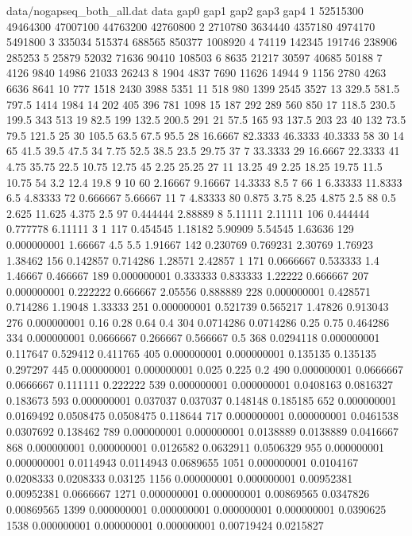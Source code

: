 \begin{filecontents}{data/nogapseq_both_all.dat}
data	gap0	gap1	gap2	gap3	gap4
1	52515300	49464300	47007100	44763200	42760800
2	2710780	3634440	4357180	4974170	5491800
3	335034	515374	688565	850377	1008920
4	74119	142345	191746	238906	285253
5	25879	52032	71636	90410	108503
6	8635	21217	30597	40685	50188
7	4126	9840	14986	21033	26243
8	1904	4837	7690	11626	14944
9	1156	2780	4263	6636	8641
10	777	1518	2430	3988	5351
11	518	980	1399	2545	3527
13	329.5	581.5	797.5	1414	1984
14	202	405	396	781	1098
15	187	292	289	560	850
17	118.5	230.5	199.5	343	513
19	82.5	199	132.5	200.5	291
21	57.5	165	93	137.5	203
23	40	132	73.5	79.5	121.5
25	30	105.5	63.5	67.5	95.5
28	16.6667	82.3333	46.3333	40.3333	58
30	14	65	41.5	39.5	47.5
34	7.75	52.5	38.5	23.5	29.75
37	7	33.3333	29	16.6667	22.3333
41	4.75	35.75	22.5	10.75	12.75
45	2.25	25.25	27	11	13.25
49	2.25	18.25	19.75	11.5	10.75
54	3.2	12.4	19.8	9	10
60	2.16667	9.16667	14.3333	8.5	7
66	1	6.33333	11.8333	6.5	4.83333
72	0.666667	5.66667	11	7	4.83333
80	0.875	3.75	8.25	4.875	2.5
88	0.5	2.625	11.625	4.375	2.5
97	0.444444	2.88889	8	5.11111	2.11111
106	0.444444	0.777778	6.11111	3	1
117	0.454545	1.18182	5.90909	5.54545	1.63636
129	0.000000001	1.66667	4.5	5.5	1.91667
142	0.230769	0.769231	2.30769	1.76923	1.38462
156	0.142857	0.714286	1.28571	2.42857	1
171	0.0666667	0.533333	1.4	1.46667	0.466667
189	0.000000001	0.333333	0.833333	1.22222	0.666667
207	0.000000001	0.222222	0.666667	2.05556	0.888889
228	0.000000001	0.428571	0.714286	1.19048	1.33333
251	0.000000001	0.521739	0.565217	1.47826	0.913043
276	0.000000001	0.16	0.28	0.64	0.4
304	0.0714286	0.0714286	0.25	0.75	0.464286
334	0.000000001	0.0666667	0.266667	0.566667	0.5
368	0.0294118	0.000000001	0.117647	0.529412	0.411765
405	0.000000001	0.000000001	0.135135	0.135135	0.297297
445	0.000000001	0.000000001	0.025	0.225	0.2
490	0.000000001	0.0666667	0.0666667	0.111111	0.222222
539	0.000000001	0.000000001	0.0408163	0.0816327	0.183673
593	0.000000001	0.037037	0.037037	0.148148	0.185185
652	0.000000001	0.0169492	0.0508475	0.0508475	0.118644
717	0.000000001	0.000000001	0.0461538	0.0307692	0.138462
789	0.000000001	0.000000001	0.0138889	0.0138889	0.0416667
868	0.000000001	0.000000001	0.0126582	0.0632911	0.0506329
955	0.000000001	0.000000001	0.0114943	0.0114943	0.0689655
1051	0.000000001	0.0104167	0.0208333	0.0208333	0.03125
1156	0.000000001	0.000000001	0.00952381	0.00952381	0.0666667
1271	0.000000001	0.000000001	0.00869565	0.0347826	0.00869565
1399	0.000000001	0.000000001	0.000000001	0.000000001	0.0390625
1538	0.000000001	0.000000001	0.000000001	0.00719424	0.0215827

\end{filecontents}
